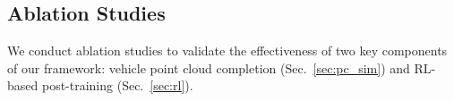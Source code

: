\documentclass[runningheads]{llncs}
\begin{document}




\subsection{Ablation Studies}
We conduct ablation studies to validate the effectiveness of two key components of our framework: vehicle point cloud completion (Sec.~\ref{sec:pc_sim}) and RL-based post-training (Sec.~\ref{sec:rl}).
\end{document}
